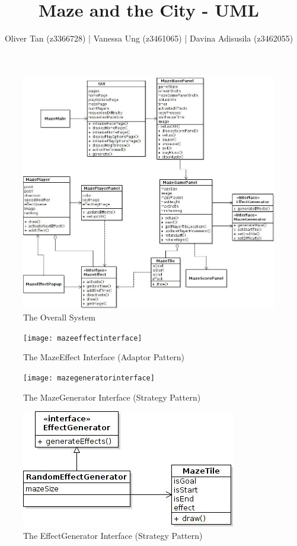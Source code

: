 \documentclass[a4paper,11pt]{article}
\begin{document}
\title{Maze and the City - UML}
\author{Oliver Tan (z3366728) | Vanessa Ung (z3461065) | Davina Adisusila (z3462055)}
\maketitle

\begin{figure}[ht!]
\centering
\includegraphics[width=\textwidth]{main}
\caption{The Overall System}
\end{figure}


\begin{figure}[ht!]
\centering
\texttt{[image: mazeeffectinterface]}
\caption{The MazeEffect Interface (Adaptor Pattern)}
\end{figure}


\begin{figure}[ht!]
\centering
\texttt{[image: mazegeneratorinterface]}
\caption{The MazeGenerator Interface (Strategy Pattern)}
\end{figure}


\begin{figure}[ht!]
\centering
\includegraphics[width=\textwidth]{mazeeffectgeneratorinterface}
\caption{The EffectGenerator Interface (Strategy Pattern)}
\end{figure}

\end{document}
